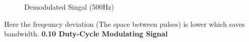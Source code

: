 \documentclass[12pt]{article}
\begin{document}
\begin{figure}[H]
    \centering
    \caption{Demodulated Singal (500Hz)}
\end{figure}
Here the freqeuncy deviation (The space between pulses) is lower which saves bandwidth. \clearpage
\textbf{0.10 Duty-Cycle Modulating Signal}
\end{document}

